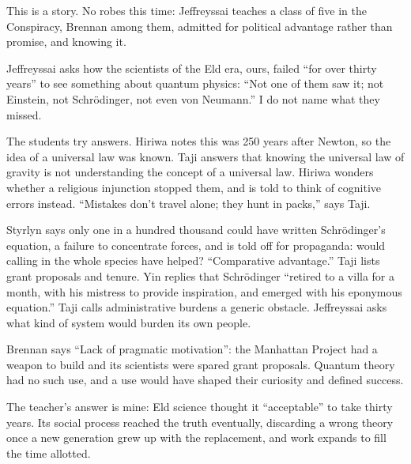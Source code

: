 
This is a story. No robes this time: Jeffreyssai teaches a class of five in the Conspiracy, Brennan among them, admitted for political advantage rather than promise, and knowing it. 

Jeffreyssai asks how the scientists of the Eld era, ours, failed ``for over thirty years'' to see something about quantum physics: ``Not one of them saw it; not Einstein, not Schrödinger, not even von Neumann.'' I do not name what they missed. 

The students try answers. Hiriwa notes this was 250 years after Newton, so the idea of a universal law was known. Taji answers that knowing the universal law of gravity is not understanding the concept of a universal law. Hiriwa wonders whether a religious injunction stopped them, and is told to think of cognitive errors instead. ``Mistakes don't travel alone; they hunt in packs,'' says Taji.

Styrlyn says only one in a hundred thousand could have written Schrödinger's equation, a failure to concentrate forces, and is told off for propaganda: would calling in the whole species have helped? ``Comparative advantage.'' Taji lists grant proposals and tenure. Yin replies that Schrödinger ``retired to a villa for a month, with his mistress to provide inspiration, and emerged with his eponymous equation.''  Taji calls administrative burdens a generic obstacle. Jeffreyssai asks what kind of system would burden its own people.

Brennan says ``Lack of pragmatic motivation'': the Manhattan Project had a weapon to build and its scientists were spared grant proposals. Quantum theory had no such use, and a use would have shaped their curiosity and defined success.

The teacher's answer is mine: Eld science thought it ``acceptable'' to take thirty years. Its social process reached the truth eventually, discarding a wrong theory once a new generation grew up with the replacement, and work expands to fill the time allotted.

